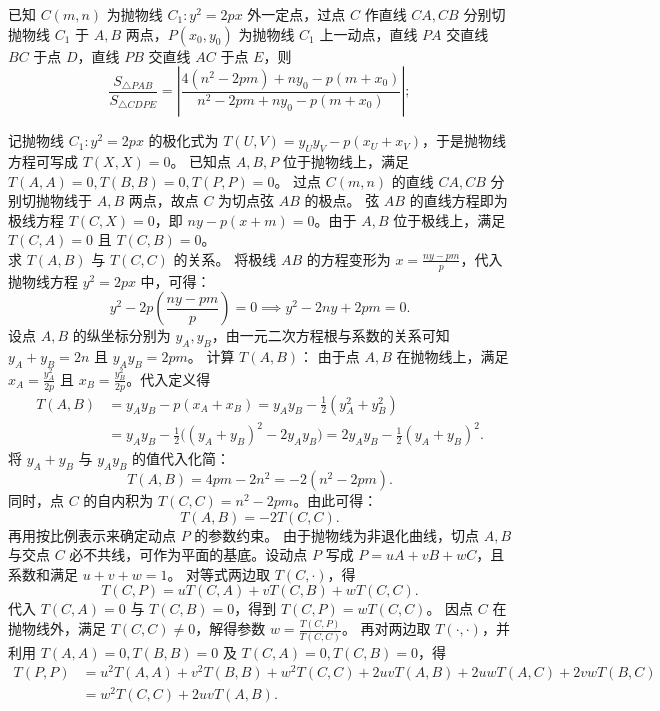 \begin{example}
已知 \(C(m,n)\) 为抛物线 \(C_1: y^2 = 2px\) 外一定点，过点 \(C\) 作直线 \(CA,CB\) 分别切抛物线 \(C_1\) 于 \(A,B\) 两点，\(P(x_0,y_0)\) 为抛物线 \(C_1\) 上一动点，直线 \(PA\) 交直线 \(BC\) 于点 \(D\)，直线 \(PB\) 交直线 \(AC\) 于点 \(E\)，则
\[
\frac{S_{\triangle PAB}}{S_{\triangle CDPE}} = \left|
\frac{
4(n^2 - 2pm) + ny_0 - p(m + x_0)
}{
n^2 - 2pm + ny_0 - p(m + x_0)
}
\right|;
\]
\end{example}
\begin{solution}
记抛物线 $C_1: y^2 = 2px$ 的极化式为 $T(U, V) = y_U y_V - p(x_U + x_V)$，于是抛物线方程可写成 $T(X,X) = 0$。
已知点 $A, B, P$ 位于抛物线上，满足 $T(A,A) = 0, T(B,B) = 0, T(P,P) = 0$。
过点 $C(m,n)$ 的直线 $CA, CB$ 分别切抛物线于 $A, B$ 两点，故点 $C$ 为切点弦 $AB$ 的极点。
弦 $AB$ 的直线方程即为极线方程 $T(C, X) = 0$，即 $ny - p(x+m) = 0$。由于 $A, B$ 位于极线上，满足 $T(C, A) = 0$ 且 $T(C, B) = 0$。\\
求 $T(A,B)$ 与 $T(C,C)$ 的关系。
将极线 $AB$ 的方程变形为 $x = \frac{ny - pm}{p}$，代入抛物线方程 $y^2 = 2px$ 中，可得：
\[ y^2 - 2p\left(\frac{ny - pm}{p}\right) = 0 \implies y^2 - 2ny + 2pm = 0. \]
设点 $A, B$ 的纵坐标分别为 $y_A, y_B$，由一元二次方程根与系数的关系可知 $y_A + y_B = 2n$ 且 $y_A y_B = 2pm$。
计算 $T(A, B)$：
由于点 $A, B$ 在抛物线上，满足 $x_A = \frac{y_A^2}{2p}$ 且 $x_B = \frac{y_B^2}{2p}$。代入定义得
\begin{align*}
T(A,B) &= y_A y_B - p(x_A + x_B) = y_A y_B - \frac{1}{2}(y_A^2 + y_B^2) \\
&= y_A y_B - \frac{1}{2}\big((y_A+y_B)^2 - 2y_A y_B\big) = 2y_A y_B - \frac{1}{2}(y_A+y_B)^2.
\end{align*}
将 $y_A + y_B$ 与 $y_A y_B$ 的值代入化简：
\[ T(A,B) = 4pm - 2n^2 = -2(n^2 - 2pm). \]
同时，点 $C$ 的自内积为 $T(C,C) = n^2 - 2pm$。由此可得：
\[ T(A, B) = -2T(C, C). \]
再用按比例表示来确定动点 $P$ 的参数约束。
由于抛物线为非退化曲线，切点 $A, B$ 与交点 $C$ 必不共线，可作为平面的基底。设动点 $P$ 写成 $P = uA + vB + wC$，且系数和满足 $u+v+w = 1$。
对等式两边取 $T(C, \cdot)$，得
\[ T(C,P) = uT(C,A) + vT(C,B) + wT(C,C). \]
代入 $T(C,A) = 0$ 与 $T(C,B) = 0$，得到 $T(C,P) = w T(C,C)$。
因点 $C$ 在抛物线外，满足 $T(C,C) \neq 0$，解得参数 $w = \frac{T(C,P)}{T(C,C)}$。
再对两边取 $T(\cdot, \cdot)$，并利用 $T(A,A) = 0, T(B,B) = 0$ 及 $T(C,A) = 0, T(C,B) = 0$，得
\begin{align*}
T(P,P) &= u^2 T(A,A) + v^2 T(B,B) + w^2 T(C,C) + 2uv T(A,B) + 2uw T(A,C) + 2vw T(B,C) \\
&= w^2 T(C,C) + 2uv T(A,B).

\end{align*}
\end{solution}
